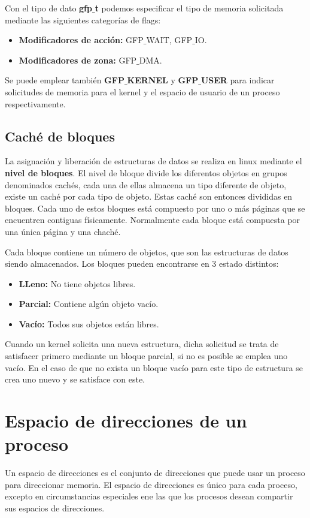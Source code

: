 Con el tipo de dato \textbf{gfp$\_$t} podemos especificar el tipo de memoria solicitada mediante las siguientes categorías de flags:

\begin{itemize}
	\item\textbf{Modificadores de acción:} GFP$\_$WAIT, GFP$\_$IO.
	\item\textbf{Modificadores de zona:} GFP$\_$DMA.
\end{itemize}

Se puede emplear también \textbf{GFP$\_$KERNEL} y \textbf{GFP$\_$USER} para indicar solicitudes de memoria para el kernel y el espacio de usuario de un proceso respectivamente.

\subsection*{Caché de bloques}
La asignación y liberación de estructuras de datos se realiza en linux mediante el \textbf{nivel de bloques}. El nivel de bloque divide los diferentos objetos en grupos denominados cachés, cada una de ellas almacena un tipo diferente de objeto, existe un caché por cada tipo de objeto. Estas caché son entonces divididas en bloques. Cada uno de estos bloques está compuesto por uno o más páginas que se encuentren contiguas físicamente. Normalmente cada bloque está compuesta por una única página y una chaché.

Cada bloque contiene un número de objetos, que son las estructuras de datos siendo almacenados. Los bloques pueden encontrarse en 3 estado distintos:

\begin{itemize}
	\item\textbf{LLeno:} No tiene objetos libres.
	\item\textbf{Parcial:} Contiene algún objeto vacío.
	\item\textbf{Vacío:} Todos sus objetos están libres.
\end{itemize}

Cuando un kernel solicita una nueva estructura, dicha solicitud se trata de satisfacer primero mediante un bloque parcial, si no es posible se emplea uno vacío. En el caso de que no exista un bloque vacío para este tipo de estructura se crea uno nuevo y se satisface con este.

\section*{Espacio de direcciones de un proceso}
Un espacio de direcciones es el conjunto de direcciones que puede usar un proceso para direccionar memoria. El espacio de direcciones es único para cada proceso, excepto en circumstancias especiales ene las que los procesos desean compartir sus espacios de direcciones.

